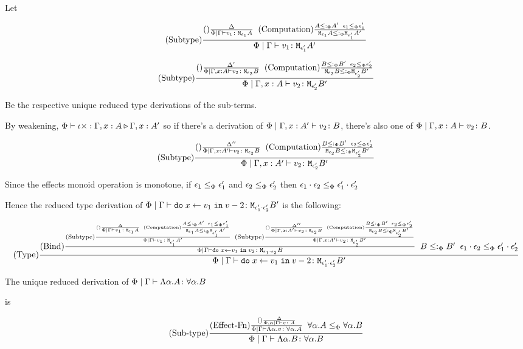 {    

    Let 

    \begin{equation}
        \edeltacrule{\G}{v_1}{\e_1}{A}{\e_1'}{A'}
    \end{equation}

    \begin{equation}
        \edeltacruleprime{\G, x:A}{v_2}{\e_2}{B}{\e_2'}{B'}
    \end{equation}

    Be the respective unique reduced type derivations of the sub-terms.

    By weakening, $\ewrel{\P}{\i\x}{\G, x:A}{\G, x: A'}$ so if there's a derivation of $\etyperelation{\P}{\G, x:A'}{v_2}{B}$, there's also one of   $\etyperelation{\P}{\gax}{v_2}{B}$.

    \begin{equation}
        \edeltacruleprimeprime{\G, x:A'}{v_2}{\e_2}{B}{\e_2'}{B'}
    \end{equation}

    Since the effects monoid operation is monotone, if $\e_1\subeffectp\e_1'$ and $\e_2\subeffectp\e_2'$ then $\e_1\dot\e_2 \subeffectp \e_1'\dot\e_2'$

    Hence the reduced type derivation of $\gpetyperelation{\doin{x}{v_1}{v-2}}{\M{\e_1'\dot\e_2'}{B'}}$ is the following:

    \begin{equation}
        \treerule{Type} {
            \treerule{Bind}{
                \edeltacrule{\G}{v_1}{\e_1}{A}{\e_1'}{A'}
                \s\s
                \edeltacruleprimeprime{\G, x:A'}{v_2}{\e_2}{B}{\e_2'}{B'}
            } {
                \gpetyperelation{\doin{x}{v_1}{v_2}}{\M{\e_1\dot\e_2}{B}}
            }
            \s\s
            B\subtypep B'
            \s\s
            \e_1\dot\e_2\subeffectp\e_1'\dot\e_2'
        } {
            \gpetyperelation{\doin{x}{v_1}{v-2}}{\M{\e_1'\dot\e_2'}{B'}}
        }
    \end{equation}


    The unique reduced derivation of $\gpetyperelation{\elam{\a}{A}}{\all{\a}{B}}$

    is 

    \begin{equation}
        \treerule{Sub-type}{
            \treerule{Effect-Fn}{
                \treerule{}{\D}{\etyperelation{\P,\a}{\G}{v}{A}}
            }{
                \gpetyperelation{\elam{\a}{v}}{\all{\a}{A}}
            }
            \s\s
            \all{\a}{A}\subeffectp\all{\a}{B}
        }{
            \gpetyperelation{\elam{\a}{B}}{\all{\a}{B}}
        }
    \end{equation}

}
